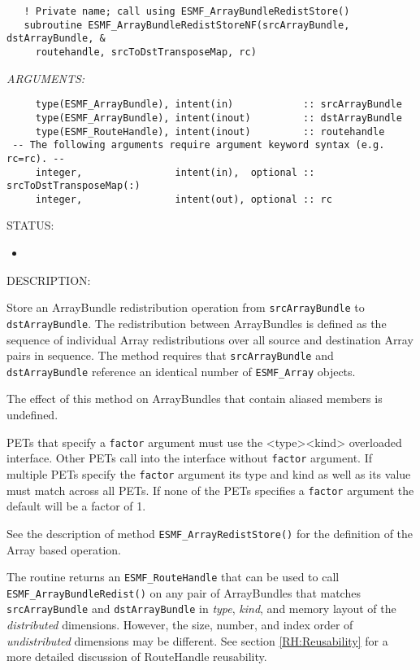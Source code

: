   
\begin{verbatim}   ! Private name; call using ESMF_ArrayBundleRedistStore()
   subroutine ESMF_ArrayBundleRedistStoreNF(srcArrayBundle, dstArrayBundle, &
     routehandle, srcToDstTransposeMap, rc)\end{verbatim}{\em ARGUMENTS:}
\begin{verbatim}     type(ESMF_ArrayBundle), intent(in)            :: srcArrayBundle
     type(ESMF_ArrayBundle), intent(inout)         :: dstArrayBundle
     type(ESMF_RouteHandle), intent(inout)         :: routehandle
 -- The following arguments require argument keyword syntax (e.g. rc=rc). --
     integer,                intent(in),  optional :: srcToDstTransposeMap(:)
     integer,                intent(out), optional :: rc\end{verbatim}
{\sf STATUS:}
   \begin{itemize}
   \item{}
   \end{itemize}
  
{\sf DESCRIPTION:\\ }


     Store an ArrayBundle redistribution operation from
     {\tt srcArrayBundle} to {\tt dstArrayBundle}. The redistribution
     between ArrayBundles is defined as the sequence of
     individual Array redistributions over all source and
     destination Array pairs in sequence. The method requires that
     {\tt srcArrayBundle} and {\tt dstArrayBundle} reference an identical
     number of {\tt ESMF\_Array} objects.
  
     The effect of this method on ArrayBundles that contain aliased members is
     undefined.
  
     PETs that specify a {\tt factor} argument must use the
     <type><kind> overloaded interface. Other PETs call into the interface
     without {\tt factor} argument. If multiple PETs specify the {\tt factor}
     argument its type and kind as well as its value must match across all
     PETs. If none of the PETs specifies a {\tt factor} argument the default
     will be a factor of 1.
  
     See the description of method {\tt ESMF\_ArrayRedistStore()} for
     the definition of the Array based operation.
  
     The routine returns an {\tt ESMF\_RouteHandle} that can be used to call 
     {\tt ESMF\_ArrayBundleRedist()} on any pair of ArrayBundles that matches 
     {\tt srcArrayBundle} and {\tt dstArrayBundle} in {\em type}, {\em kind},
     and memory layout of the {\em distributed} dimensions. However, the size, 
     number, and index order of {\em undistributed} dimensions may be different.
     See section \ref{RH:Reusability} for a more detailed discussion of
     RouteHandle reusability.
    
